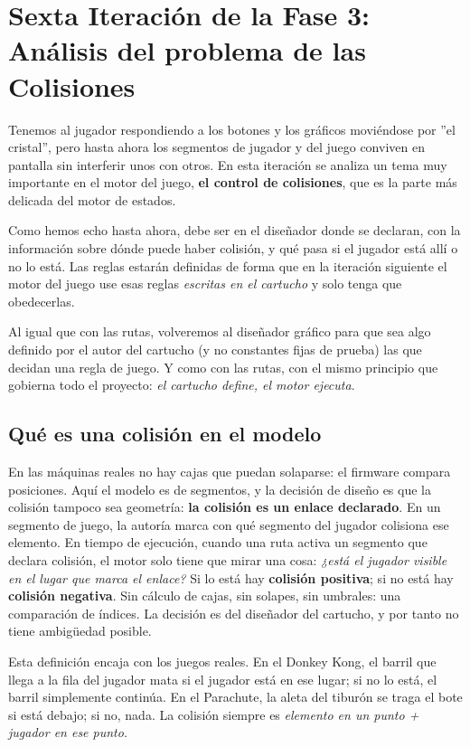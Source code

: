 \section{Sexta Iteración de la Fase 3: Análisis del problema de las Colisiones}
\label{sec:AnalisisColisiones}

Tenemos al jugador respondiendo a los botones y los gráficos moviéndose por 
''el cristal'', pero hasta ahora los segmentos de jugador y del juego
conviven en pantalla sin interferir unos con otros. 
En esta iteración se analiza un tema muy importante
en el motor del juego, \textbf{el control de colisiones}, que es la 
parte más delicada del motor de estados. 

Como hemos echo hasta ahora, debe ser en el diseñador donde se declaran, 
con la información sobre dónde puede 
haber colisión, y qué pasa si el jugador está allí o no lo está. Las reglas 
estarán definidas de forma que en la iteración siguiente el motor del juego 
use esas reglas \emph{escritas en el cartucho} y solo tenga que
obedecerlas.

Al igual que con las rutas, volveremos al diseñador gráfico para que sea algo
definido por el autor del cartucho (y no constantes fijas de prueba) las que decidan 
una regla de juego. Y como con las rutas, con el mismo principio que
gobierna todo el proyecto: \emph{el cartucho define, el motor ejecuta}.

\subsection{Qué es una colisión en el modelo}

En las máquinas reales no hay cajas que puedan solaparse: el firmware compara
posiciones. Aquí el modelo es de segmentos, y la decisión de diseño es
que la colisión tampoco sea geometría: \textbf{la colisión es un enlace
	declarado}. En un segmento de juego, la autoría marca con qué segmento
del jugador colisiona ese elemento. En tiempo de ejecución, cuando una
ruta activa un segmento que declara colisión, el motor solo tiene que
mirar una cosa: \emph{¿está el jugador visible en el lugar que marca el enlace?}
Si lo está hay \textbf{colisión positiva}; si no está hay \textbf{colisión negativa}. 
Sin cálculo de cajas, sin
solapes, sin umbrales: una comparación de índices. La decisión es del
diseñador del cartucho, y por tanto no tiene ambigüedad posible.

Esta definición encaja con los juegos reales. En el Donkey Kong, el
barril que llega a la fila del jugador mata si el jugador está en ese
lugar; si no lo está, el barril simplemente continúa. En el Parachute,
la aleta del tiburón se traga el bote si está debajo; si no, nada. La
colisión siempre es \emph{elemento en un punto + jugador en ese punto}.

